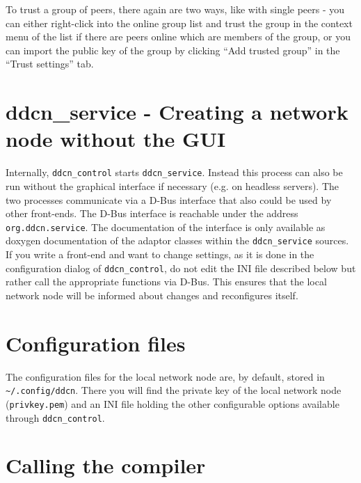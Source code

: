 \documentclass[a4paper,9pt]{scrartcl}
\begin{document}
To trust a group of peers, there again are two ways, like with single peers - you can either right-click into the online group list and trust the group in the context menu of the list if there are peers online which are members of the group, or you can import the public key of the group by clicking ``Add trusted group'' in the ``Trust settings'' tab.

\section{ddcn\_service - Creating a network node without the GUI}

Internally, \texttt{ddcn\_control} starts \texttt{ddcn\_service}. Instead this process can also be run without the graphical interface if necessary (e.g. on headless servers). The two processes communicate via a D-Bus interface that also could be used by other front-ends. The D-Bus interface is reachable under the address \texttt{org.ddcn.service}. The documentation of the interface is only available as doxygen documentation of the adaptor classes within the \texttt{ddcn\_service} sources. If you write a front-end and want to change settings, as it is done in the configuration dialog of \texttt{ddcn\_control}, do not edit the INI file described below but rather call the appropriate functions via D-Bus. This ensures that the local network node will be informed about changes and reconfigures itself.

\section{Configuration files}

The configuration files for the local network node are, by default, stored in \texttt{\textasciitilde/.config/ddcn}. There you will find the private key of the local network node (\texttt{privkey.pem}) and an INI file holding the other configurable options available through \texttt{ddcn\_control}.

\section{Calling the compiler}
\end{document}
